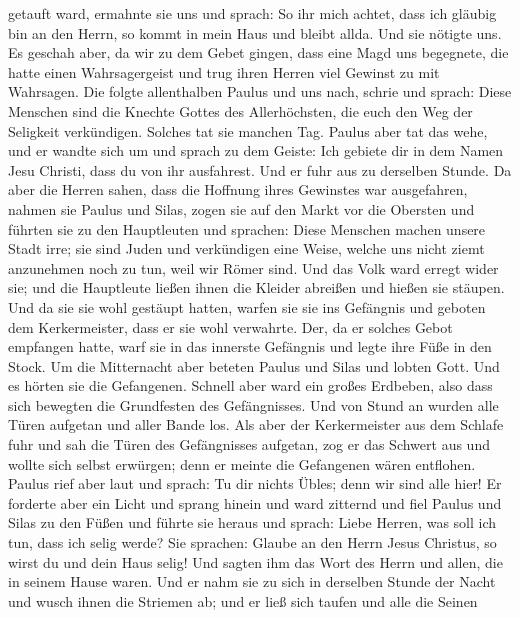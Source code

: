 getauft ward, ermahnte sie uns und sprach: So ihr mich achtet, dass ich
gläubig bin an den Herrn, so kommt in mein Haus und bleibt allda. Und
sie nötigte uns.  Es geschah aber, da wir zu dem Gebet
gingen, dass eine Magd uns begegnete, die hatte einen Wahrsagergeist und
trug ihren Herren viel Gewinst zu mit Wahrsagen.  Die
folgte allenthalben Paulus und uns nach, schrie und sprach: Diese
Menschen sind die Knechte Gottes des Allerhöchsten, die euch den Weg der
Seligkeit verkündigen.  Solches tat sie manchen Tag. Paulus
aber tat das wehe, und er wandte sich um und sprach zu dem Geiste: Ich
gebiete dir in dem Namen Jesu Christi, dass du von ihr ausfahrest. Und
er fuhr aus zu derselben Stunde.  Da aber die Herren sahen,
dass die Hoffnung ihres Gewinstes war ausgefahren, nahmen sie Paulus und
Silas, zogen sie auf den Markt vor die Obersten  und
führten sie zu den Hauptleuten und sprachen: Diese Menschen machen
unsere Stadt irre; sie sind Juden  und verkündigen eine
Weise, welche uns nicht ziemt anzunehmen noch zu tun, weil wir Römer
sind.  Und das Volk ward erregt wider sie; und die
Hauptleute ließen ihnen die Kleider abreißen und hießen sie stäupen.
 Und da sie sie wohl gestäupt hatten, warfen sie sie ins
Gefängnis und geboten dem Kerkermeister, dass er sie wohl verwahrte.
 Der, da er solches Gebot empfangen hatte, warf sie in das
innerste Gefängnis und legte ihre Füße in den Stock.  Um
die Mitternacht aber beteten Paulus und Silas und lobten Gott. Und es
hörten sie die Gefangenen.  Schnell aber ward ein großes
Erdbeben, also dass sich bewegten die Grundfesten des Gefängnisses. Und
von Stund an wurden alle Türen aufgetan und aller Bande los.
 Als aber der Kerkermeister aus dem Schlafe fuhr und sah
die Türen des Gefängnisses aufgetan, zog er das Schwert aus und wollte
sich selbst erwürgen; denn er meinte die Gefangenen wären entflohen.
 Paulus rief aber laut und sprach: Tu dir nichts Übles;
denn wir sind alle hier!  Er forderte aber ein Licht und
sprang hinein und ward zitternd und fiel Paulus und Silas zu den Füßen
 und führte sie heraus und sprach: Liebe Herren, was soll
ich tun, dass ich selig werde?  Sie sprachen: Glaube an den
Herrn Jesus Christus, so wirst du und dein Haus selig!  Und
sagten ihm das Wort des Herrn und allen, die in seinem Hause waren.
 Und er nahm sie zu sich in derselben Stunde der Nacht und
wusch ihnen die Striemen ab; und er ließ sich taufen und alle die Seinen
